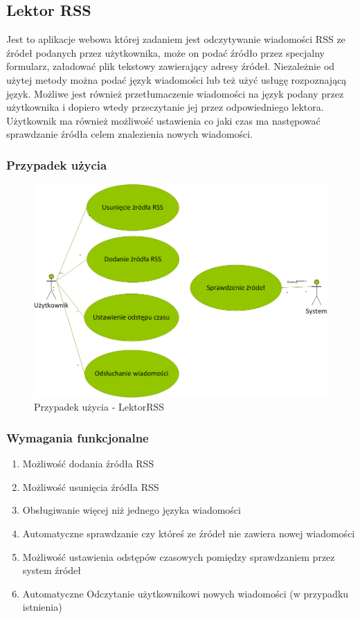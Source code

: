\subsection{Lektor RSS}
Jest to aplikacje webowa której zadaniem jest odczytywanie wiadomości RSS ze źródeł podanych przez użytkownika, może on podać źródło przez specjalny formularz, załadować plik tekstowy zawierający adresy źródeł. Niezależnie od użytej metody można podać język wiadomości lub też użyć usługę rozpoznającą język. Możliwe jest również przetłumaczenie wiadomości na język podany przez użytkownika i dopiero wtedy przeczytanie jej przez odpowiedniego lektora. Użytkownik ma również możliwość ustawienia co jaki czas ma następować sprawdzanie źródła celem znalezienia nowych wiadomości.	 
\newpage
\subsubsection{Przypadek użycia}
\begin{figure}[!h]
	\centering
	\includegraphics[scale=0.45]{useCaseRSS.png} 
	\caption{Przypadek użycia - LektorRSS}
\end{figure}

\subsubsection{Wymagania funkcjonalne}
\begin{enumerate}
	\item Możliwość dodania źródła RSS
	\item Możliwość usunięcia źródła RSS
	\item Obsługiwanie więcej niż jednego języka wiadomości
	\item Automatyczne sprawdzanie czy któreś ze źródeł nie zawiera nowej wiadomości
	\item Możliwość ustawienia odstępów czasowych pomiędzy sprawdzaniem przez system źródeł
	\item Automatyczne Odczytanie użytkownikowi nowych wiadomości (w przypadku istnienia) 
\end{enumerate}  
